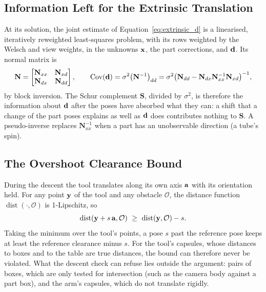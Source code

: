 \subsection{Information Left for the Extrinsic Translation}
At its solution, the joint estimate of Equation~\ref{eq:extrinsic_d} is a linearised, iteratively
reweighted least-squares problem, with its rows weighted by the Welsch and view weights, in the
unknowns $\mathbf{x}$, the part corrections, and $\mathbf{d}$. Its normal matrix is
\begin{equation}
\mathbf{N}=\begin{bmatrix}\mathbf{N}_{xx}&\mathbf{N}_{xd}\\ \mathbf{N}_{dx}&\mathbf{N}_{dd}\end{bmatrix},
\qquad
\operatorname{Cov}(\mathbf{d})=\sigma^2\big(\mathbf{N}^{-1}\big)_{dd}=\sigma^2\big(\mathbf{N}_{dd}-\mathbf{N}_{dx}\mathbf{N}_{xx}^{-1}\mathbf{N}_{xd}\big)^{-1},
\end{equation}
by block inversion. The Schur complement $\mathbf{S}$, divided by $\sigma^2$, is therefore the
information about $\mathbf{d}$ after the poses have absorbed what they can: a shift that a change of the part poses explains as well
as $\mathbf{d}$ does contributes nothing to $\mathbf{S}$. A pseudo-inverse replaces $\mathbf{N}_{xx}^{-1}$
when a part has an unobservable direction (a tube's spin).

\subsection{The Overshoot Clearance Bound}
During the descent the tool translates along its own axis $\mathbf{a}$ with its orientation held. For
any point $\mathbf{y}$ of the tool and any obstacle $\mathcal{O}$, the distance function
$\operatorname{dist}(\cdot,\mathcal{O})$ is 1-Lipschitz, so
\begin{equation}
\operatorname{dist}(\vect{y}+s\,\vect{a},\mathcal{O})\ \ge\ \operatorname{dist}(\vect{y},\mathcal{O})-s .
\end{equation}
Taking the minimum over the tool's points, a pose $s$ past the reference pose keeps at least the
reference clearance minus $s$. For the tool's capsules, whose distances to boxes and to the table are
true distances, the bound can therefore never be violated. What the descent check can refuse lies
outside the argument: pairs of boxes, which are only tested for intersection (such as the camera body
against a part box), and the arm's capsules, which do not translate rigidly.

